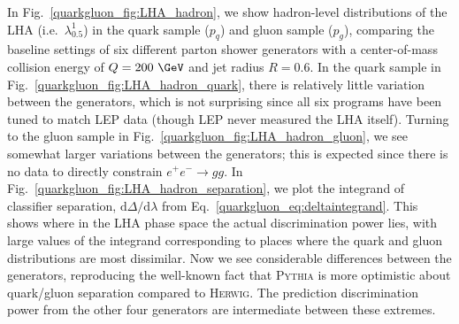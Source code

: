 \documentclass[11pt]{cernrep}
\begin{document}
In Fig.~\ref{quarkgluon_fig:LHA_hadron}, we show hadron-level distributions of the LHA (i.e.~$\lambda_{0.5}^1$) in the quark sample ($p_q$) and gluon sample ($p_g$), comparing the baseline settings of six different parton shower generators with a center-of-mass collision energy of $Q = 200~\GeV$ and jet radius $R = 0.6$. In the quark sample in Fig.~\ref{quarkgluon_fig:LHA_hadron_quark}, there is relatively little variation between the generators, which is not surprising since all six programs have been tuned to match LEP data (though LEP never measured the LHA itself).  Turning to the gluon sample in Fig.~\ref{quarkgluon_fig:LHA_hadron_gluon}, we see somewhat larger variations between the generators; this is expected since there is no data to directly constrain $e^+ e^- \to gg$.  In Fig.~\ref{quarkgluon_fig:LHA_hadron_separation}, we plot the integrand of classifier separation, $\text{d} \Delta / \text{d} \lambda$ from Eq.~\eqref{quarkgluon_eq:deltaintegrand}. This shows where in the LHA phase space the actual discrimination power lies, with large values of the integrand
corresponding to places where the quark and gluon distributions are
most dissimilar.  Now we see considerable differences between the
generators, reproducing the well-known fact that \textsc{Pythia} is
more optimistic about quark/gluon separation compared to
\textsc{Herwig}.  The prediction discrimination power from the other four generators are intermediate between these
extremes.
\end{document}
